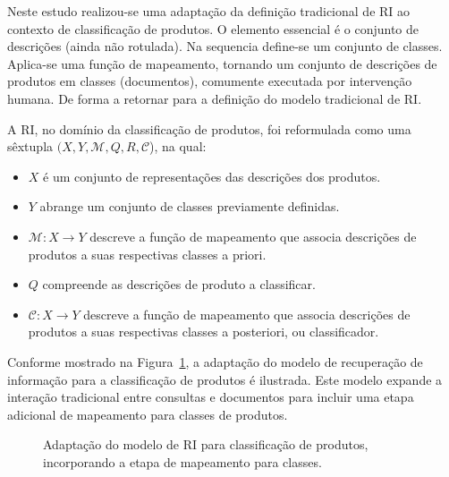 Neste estudo realizou-se uma adaptação da definição tradicional de RI ao contexto de classificação de produtos. O elemento essencial é o conjunto de descrições (ainda não rotulada).  Na sequencia define-se um conjunto de classes.  Aplica-se uma função de mapeamento, tornando um conjunto de descrições de produtos em classes (documentos), comumente executada por intervenção humana.  De forma a retornar para a definição do modelo tradicional de RI.

A RI, no domínio da classificação de produtos, foi reformulada como uma sêxtupla \( ( X, Y, \mathcal{M},Q, R, \mathcal{C} \)), na qual:
\begin{itemize}
    \item \( X \) é um conjunto de representações das descrições dos produtos.
    \item \( Y \) abrange um conjunto de classes previamente definidas.
    \item \( \mathcal{M}: X \to Y \) descreve a função de mapeamento que associa descrições de produtos a suas respectivas classes a priori.
    \item \( Q \) compreende as descrições de produto a classificar.
    \item \( \mathcal{C}: X \to Y \) descreve a função de mapeamento que associa descrições de produtos a suas respectivas classes a posteriori, ou classificador.    
\end{itemize}

Conforme mostrado na Figura~\ref{fig:ri_adapted_model}, a adaptação do modelo de recuperação de informação para a classificação de produtos é ilustrada. Este modelo expande a interação tradicional entre consultas e documentos para incluir uma etapa adicional de mapeamento para classes de produtos.

\begin{figure}[ht]
\centering
{}
\caption{Adaptação do modelo de RI para classificação de produtos, incorporando a etapa de mapeamento para classes.}
\label{fig:ri_adapted_model}
\end{figure}

